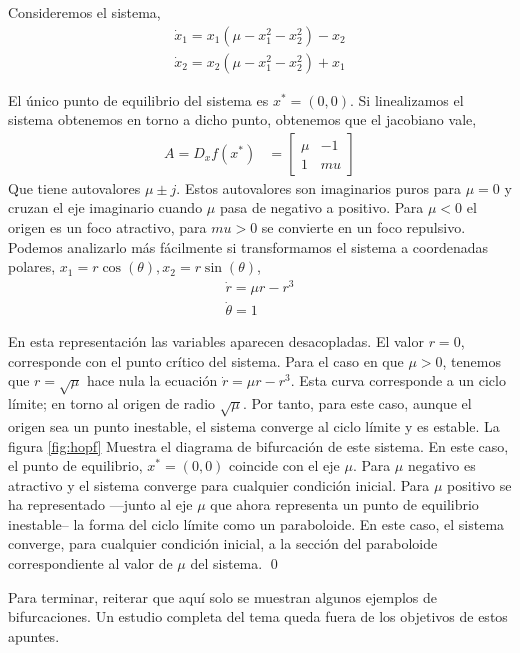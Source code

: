 \begin{example}\label{ex:hopf}
Consideremos el sistema,
\begin{align*}
\dot x_1 = x_1(\mu-x_1^2-x_2^2)-x_2\\
\dot x_2 = x_2(\mu-x_1^2-x_2^2) +x_1
\end{align*}

El único punto de equilibrio del sistema es $x^*= (0,0)$. Si linealizamos el sistema obtenemos en torno a dicho punto, obtenemos que el jacobiano vale,
\begin{align*}
	A = D_xf(x^*) &=  \begin{bmatrix}
		\mu &  -1 \\
		1 & mu
	\end{bmatrix}
\end{align*}
Que tiene autovalores $\mu\pm j$. Estos autovalores son imaginarios puros para $\mu=0$ y cruzan el eje imaginario cuando $\mu$ pasa de negativo a positivo. Para $\mu<0$ el origen es un foco atractivo, para $mu>0$ se convierte en un foco repulsivo.
Podemos analizarlo más fácilmente si transformamos el sistema a coordenadas polares, $x_1= r\cos(\theta), x_2 = r\sin(\theta)$,
\begin{align*}
\dot r = \mu r - r^3\\
\dot \theta = 1
\end{align*}

En esta representación las variables aparecen desacopladas. El valor $r=0$, corresponde con el punto crítico del sistema. Para el caso en que $\mu>0$, tenemos que $r=\sqrt{\mu}$ hace nula la ecuación  $\dot r = \mu r - r^3$. Esta curva corresponde a un ciclo límite; en torno al origen de radio $\sqrt{\mu}$. Por tanto, para este caso, aunque el origen sea un punto inestable, el sistema converge al ciclo límite y es estable. La figura \ref{fig:hopf} Muestra el diagrama de bifurcación de este sistema.  En este caso, el punto de equilibrio, $x^*=(0,0)$ coincide con el eje $\mu$. Para $\mu$ negativo es atractivo y el sistema converge para cualquier condición inicial. Para $\mu$ positivo se ha representado ---junto al eje $\mu$ que ahora representa un punto de equilibrio inestable--   la forma del ciclo límite como un paraboloide. En este caso, el sistema converge, para cualquier condición inicial,  a la sección del paraboloide correspondiente al valor de $\mu$ del sistema.
\qed
\end{example}

Para terminar, reiterar que aquí solo se muestran algunos ejemplos de bifurcaciones. Un estudio completa del tema queda fuera de los objetivos de estos apuntes.
\newpage
